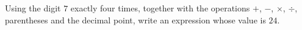 Using the digit $7$ exactly four times, together with the operations $+$, $-$, $\times$, $\div$, parentheses and the decimal point, write an expression whose value is $24$.
